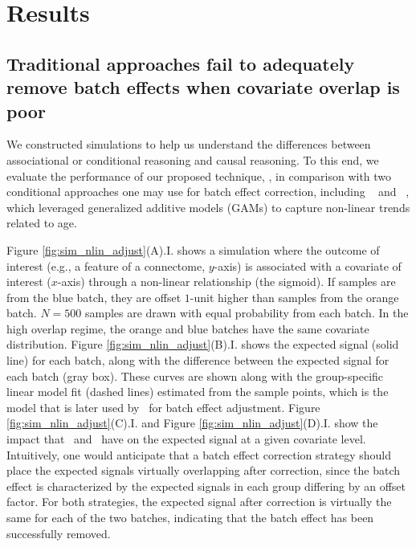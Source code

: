 \section{Results}
\label{sec:results}
\subsection{Traditional approaches fail to adequately remove batch effects when covariate overlap is poor}
\label{sec:results:sims}
We constructed simulations to help us understand the differences between associational or conditional reasoning and causal reasoning. To this end, we evaluate the performance of our proposed technique, \cccombat, in comparison with two conditional approaches one may use for batch effect correction, including \ccombat~\cite{Johnson2007Jan} and \combatgam~\cite{Pomponio2020Mar}, which leveraged generalized additive models (GAMs) to capture non-linear trends related to age.

Figure \ref{fig:sim_nlin_adjust}(A).I. shows a simulation where the outcome of interest (e.g., a feature of a connectome, $y$-axis) is associated with a covariate of interest ($x$-axis) through a non-linear relationship (the sigmoid). If samples are from the blue batch, they are offset $1$-unit higher than samples from the orange batch. $N=500$ samples are drawn with equal probability from each batch. In the high overlap regime, the orange and blue batches have the same covariate distribution. Figure \ref{fig:sim_nlin_adjust}(B).I. shows the expected signal (solid line) for each batch, along with the difference between the expected signal for each batch (gray box). These curves are shown along with the group-specific linear model fit (dashed lines) estimated from the sample points, which is the model that is later used by \ccombat~for batch effect adjustment. Figure \ref{fig:sim_nlin_adjust}(C).I. and Figure \ref{fig:sim_nlin_adjust}(D).I. show the impact that \ccombat~and \cccombat~have on the expected signal at a given covariate level. Intuitively, one would anticipate that a batch effect correction strategy should place the expected signals virtually overlapping after correction, since the batch effect is characterized by the expected signals in each group differing by an offset factor. For both strategies, the expected signal after correction is virtually the same for each of the two batches, indicating that the batch effect has been successfully removed. 


